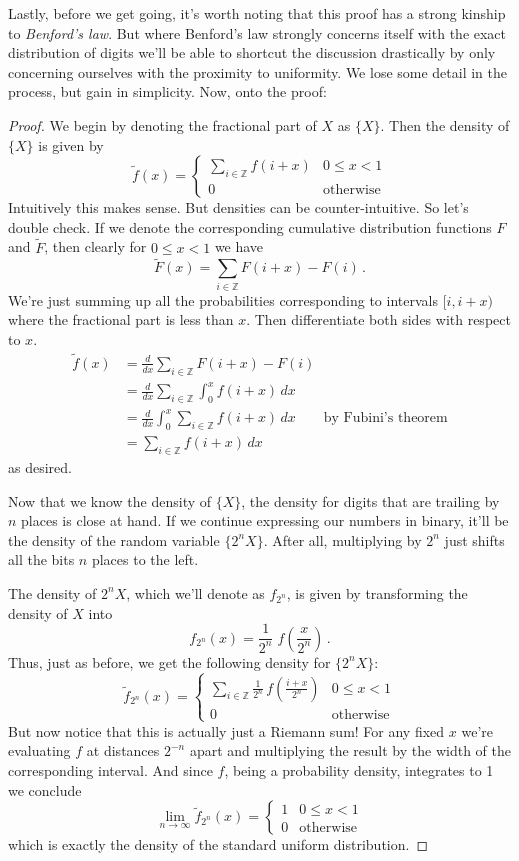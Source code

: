\documentclass{article}
\theoremstyle{theorem}
\theoremstyle{definition}
\begin{document}
Lastly, before we get going, it's worth noting that this proof has a strong kinship to \textit{Benford's law}. But where Benford's law strongly concerns itself with the exact distribution of digits we'll be able to shortcut the discussion drastically by only concerning ourselves with the proximity to uniformity. We lose some detail in the process, but gain in simplicity. Now, onto the proof:

\begin{proof}
We begin by denoting the fractional part of $X$ as $\{X\}$. Then the density of $\{X\}$ is given by
\[
\tilde{f}(x) =
\begin{cases}
\sum_{i\in\mathbb{Z}}f(i+x) & 0 \leq x < 1\\
0 & \text{otherwise}
\end{cases}
\]
Intuitively this makes sense. But densities can be counter-intuitive. So let's double check. If we denote the corresponding cumulative distribution functions $F$ and $\tilde{F}$, then clearly for $0 \leq x < 1$ we have
\[
\tilde{F}(x) = \sum_{i\in\mathbb{Z}}F(i+x)-F(i)\,.
\]
We're just summing up all the probabilities corresponding to intervals $[i,i+x)$ where the fractional part is less than $x$. Then differentiate both sides with respect to $x$.
\[
\begin{split}
\tilde{f}(x) & =\frac{d}{dx}\sum_{i\in\mathbb{Z}}F(i+x)-F(i)\\
& =\frac{d}{dx}\sum_{i\in\mathbb{Z}}\int_0^x f(i+x)\,dx\\
& =\frac{d}{dx}\int_0^x\sum_{i\in\mathbb{Z}}f(i+x)\,dx\qquad\text{by Fubini's theorem}\\
& =\sum_{i\in\mathbb{Z}}f(i+x)\,dx
\end{split}
\]
as desired.

Now that we know the density of $\{X\}$, the density for digits that are trailing by $n$ places is close at hand. If we continue expressing our numbers in binary, it'll be the density of the random variable $\{2^nX\}$. After all, multiplying by $2^n$ just shifts all the bits $n$ places to the left.

The density of $2^nX$, which we'll denote as $f_{2^n}$, is given by transforming the density of $X$ into
\[
f_{2^n}(x) = \frac{1}{2^n}\;f\left(\frac{x}{2^n}\right)\,.
\]
Thus, just as before, we get the following density for $\{2^nX\}$:
\[
\tilde{f}_{2^n}(x)=
\begin{cases}
\sum_{i\in\mathbb{Z}}\frac{1}{2^n}\,f\left(\frac{i+x}{2^n}\right) & 0\leq x < 1\\
0 & \text{otherwise}
\end{cases}
\]
But now notice that this is actually just a Riemann sum! For any fixed $x$ we're evaluating $f$ at distances $2^{-n}$ apart and multiplying the result by the width of the corresponding interval. And since $f$, being a probability density, integrates to 1 we conclude
\[
\lim_{n\rightarrow\infty}\tilde{f}_{2^n}(x) = 
\begin{cases}
1 & 0\leq x< 1\\
0 & \text{otherwise}
\end{cases}
\]
which is exactly the density of the standard uniform distribution.
\end{proof}
\end{document}
